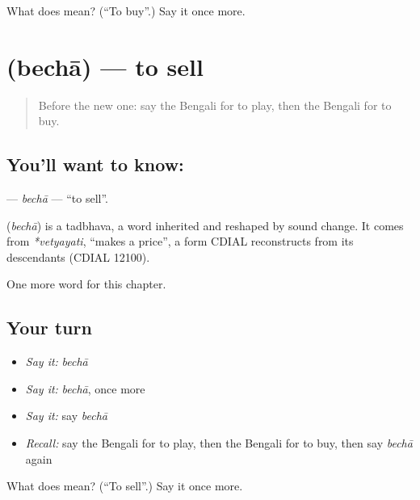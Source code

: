 \begin{tcolorbox}[breakable,colback=teal!4,colframe=teal!35!black,title={Before you move on}]
What does  mean? (\textquotedblleft{}To buy\textquotedblright{}.) Say it once more.
\end{tcolorbox}
\section[\texorpdfstring{\bn{বেচা} (bechā)}{বেচা (bechā)}]{ (bechā) — to sell}

\label{lesson:BN-C49-becha}



\begin{quote}
Before the new one: say the Bengali for to play, then the Bengali for to buy.
\end{quote}

\subsection*{You'll want to know: }
\textbf{} — \emph{bechā} — \textquotedblleft{}to sell\textquotedblright{}.

\begin{cousinweb}
\textbf{} (\emph{bechā}) is a tadbhava, a word inherited and reshaped by sound change. It comes from \emph{*vetyayati}, \textquotedblleft{}makes a price\textquotedblright{}, a form CDIAL reconstructs from its descendants (CDIAL 12100).
\end{cousinweb}

\begin{grammarlens}[title={What you've built}]
One more word for this chapter.
\end{grammarlens}

\subsection*{Your turn}
\begin{itemize}
\raggedright
  \item \emph{Say it:} \emph{bechā}
  \item \emph{Say it:} \emph{bechā}, once more
  \item \emph{Say it:} say \emph{bechā}
  \item \emph{Recall:} say the Bengali for to play, then the Bengali for to buy, then say \emph{bechā} again
\end{itemize}

\begin{tcolorbox}[breakable,colback=teal!4,colframe=teal!35!black,title={Before you move on}]
What does  mean? (\textquotedblleft{}To sell\textquotedblright{}.) Say it once more.
\end{tcolorbox}
